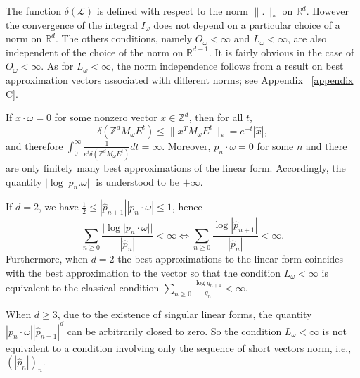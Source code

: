 \documentclass[12pt,reqno,a4paper]{amsart}%
\numberwithin{equation}{section}
\newcommand{\LL}{{\mathcal L}}
\newcommand{\Rr}{{\mathbb{R}}}
\newcommand{\Zz}{{\mathbb{Z}}}
\begin{document}
	
\begin{remark}
	The function $\delta(\LL)$ is defined with respect  to the norm $\|.\|_*$ on $\Rr^{d}$. However the convergence of the integral $I_{\omega}$ does not depend on a particular choice of a norm on $\Rr^d$. 
	The others conditions, namely $O_{\omega}<\infty$ and $L_{\omega}<\infty$, are also independent of the choice of the norm on $\Rr^{d-1}$. It is fairly obvious in the case of $O_{\omega}<\infty$. As  for $L_{\omega}<\infty$, the norm independence follows from a result on best approximation vectors associated with different norms; see Appendix ~\ref{appendix C}.   
\end{remark}

\begin{remark}\label{rem:lineardep} 

	
If $x\cdot\omega=0$ for some nonzero vector $x\in\Zz^d$, then for all $t$,
		\[
		\delta(\Zz^dM_{\omega}E^t)\leq \|x^TM_{\omega}E^t\|_*= e^{-t}|\hat x|,
		\] 
		and therefore 	$\int_{0}^{\infty}\frac{1}{e^t\delta(\Zz^dM_{\omega}E^t)}dt=\infty$. Moreover,   $p_n\cdot\omega=0$ for some $n$ and there are only finitely many best approximations of the linear form. Accordingly, the quantity $|\log|p_n.\omega||$  is understood to be $+\infty$.
\end{remark}	


\begin{remark}
	If $d=2$, we have $\tfrac12\leq |\hat p_{n+1}||p_n\cdot\omega|\leq 1$, hence  
	$$
	\sum_{n\geq 0}\frac{|\log |p_n\cdot\omega||}{|\hat p_n|}<\infty\iff \sum_{n\geq 0}\frac{\log |\hat p_{n+1}|}{|\hat p_n|}<\infty.
	$$ 
	Furthermore, when $d=2$ the best approximations to the linear form coincides with the best approximation to the vector so that the condition $L_{\omega}<\infty$ is equivalent to the classical condition  $\sum_{n\geq 0}\frac{\log q_{n+1}}{q_n}<\infty$.
\end{remark}


\begin{remark}
	When $d\geq 3$, due to the existence of singular linear forms, the quantity $|p_n\cdot\omega||\hat p_{n+1}|^d$ can be arbitrarily closed to zero. So the  condition $L_{\omega}<\infty$ is not equivalent to a condition involving only  the sequence   of  short vectors norm, i.e., $(|\hat p_n|)_n$.
\end{remark}
\end{document}
